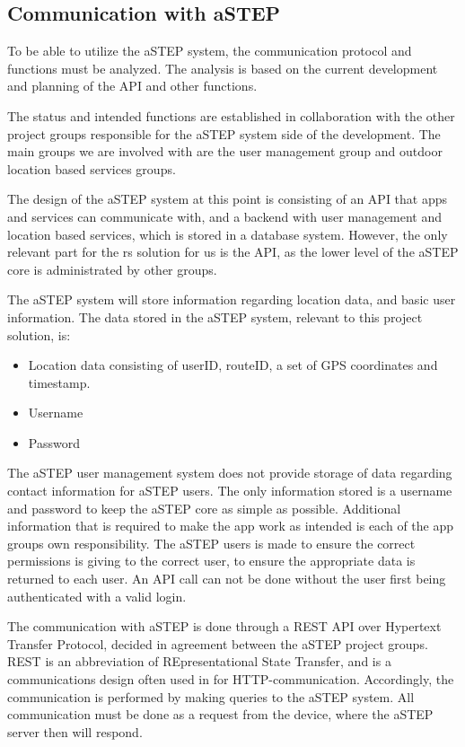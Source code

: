 \subsection{Communication with aSTEP}\label{ssec:communicationwithastep}
To be able to utilize the aSTEP system, the communication protocol and functions must be analyzed. 
The analysis is based on the current development and planning of the API and other functions.

The status and intended functions are established in collaboration with the other project groups responsible for the aSTEP system side of the development. 
The main groups we are involved with are the user management group and outdoor location based services groups.

The design of the aSTEP system at this point is consisting of an API that apps and services can communicate with, and a backend with user management and location based services, which is stored in a database system.
However, the only relevant part for the \gls{rs} solution for us is the API, as the lower level of the aSTEP core is administrated by other groups.

The aSTEP system will store information regarding location data, and basic user information. 
The data stored in the aSTEP system, relevant to this project solution, is:
\begin{itemize}
	\item Location data consisting of userID, routeID, a set of GPS coordinates and timestamp.
	\item Username
	\item Password
\end{itemize}

The aSTEP user management system does not provide storage of data regarding contact information for aSTEP users.
The only information stored is a username and password to keep the aSTEP core as simple as possible.
Additional information that is required to make the app work as intended is each of the app groups own responsibility.
The aSTEP users is made to ensure the correct permissions is giving to the correct user, to ensure the appropriate data is returned to each user.
An API call can not be done without the user first being authenticated with a valid login.

The communication with aSTEP is done through a REST API over Hypertext Transfer Protocol, decided in agreement between the aSTEP project groups.
REST is an abbreviation of REpresentational State Transfer, and is a communications design often used in for HTTP-communication\cite{REST}.
Accordingly, the communication is performed by making queries to the aSTEP system. 
All communication must be done as a request from the device, where the aSTEP server then will respond.


